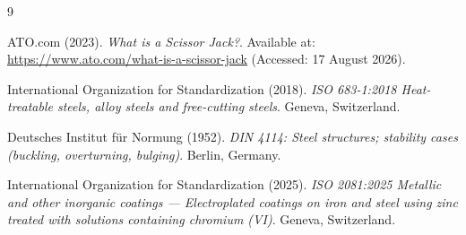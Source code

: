 \documentclass[11pt, a4paper]{article}
\begin{document}
\vspace{1em} %

\begin{thebibliography}{9}

ATO.com (2023). 
\textit{What is a Scissor Jack?}. 
Available at: \url{https://www.ato.com/what-is-a-scissor-jack} (Accessed: 17 August 2026).

International Organization for Standardization (2018).
\textit{ISO 683-1:2018 Heat-treatable steels, alloy steels and free-cutting steels}. Geneva, Switzerland.

Deutsches Institut für Normung (1952).
\textit{DIN 4114: Steel structures; stability cases (buckling, overturning, bulging)}. Berlin, Germany.

International Organization for Standardization (2025).
\textit{ISO 2081:2025 Metallic and other inorganic coatings — Electroplated coatings on iron and steel using zinc treated with solutions containing chromium (VI)}. Geneva, Switzerland.

\end{thebibliography}
\end{document}
